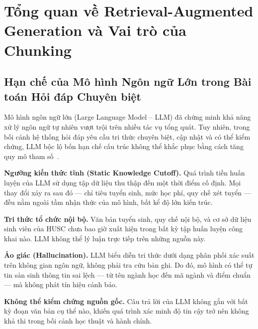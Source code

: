 \documentclass[12pt,a4paper]{report}
\theoremstyle{plain}
\theoremstyle{definition}
\begin{document}
	
	
	\chapter{Tổng quan về Retrieval-Augmented Generation và Vai trò của Chunking}
	\label{chap:rag_overview}
	
	\section{Hạn chế của Mô hình Ngôn ngữ Lớn trong Bài toán Hỏi đáp Chuyên biệt}
	\label{sec:llm_limits}
	
	Mô hình ngôn ngữ lớn (Large Language Model -- LLM) đã chứng minh khả năng
	xử lý ngôn ngữ tự nhiên vượt trội trên nhiều tác vụ tổng quát. Tuy nhiên,
	trong bối cảnh hệ thống hỏi đáp yêu cầu tri thức chuyên biệt, cập nhật và
	có thể kiểm chứng, LLM bộc lộ bốn hạn chế cấu trúc không thể khắc phục bằng
	cách tăng quy mô tham số~\cite{lewis2020retrieval}.
	
	\textbf{Ngưỡng kiến thức tĩnh (Static Knowledge Cutoff).} Quá trình tiền
	huấn luyện của LLM sử dụng tập dữ liệu thu thập đến một thời điểm cố định.
	Mọi thay đổi xảy ra sau đó --- chỉ tiêu tuyển sinh, mức học phí, quy chế
	xét tuyển --- đều nằm ngoài tầm nhận thức của mô hình, bất kể độ lớn kiến
	trúc.
	
	\textbf{Tri thức tổ chức nội bộ.} Văn bản tuyển sinh, quy chế nội bộ, và
	cơ sở dữ liệu sinh viên của HUSC chưa bao giờ xuất hiện trong bất kỳ tập
	huấn luyện công khai nào. LLM không thể lý luận trực tiếp trên những nguồn
	này.
	
	\textbf{Ảo giác (Hallucination).} LLM biểu diễn tri thức dưới dạng phân
	phối xác suất trên không gian ngôn ngữ, không phải tra cứu bản ghi. Do đó,
	mô hình có thể tự tin sản sinh thông tin sai lệch --- từ tên ngành học đến
	mã ngành và điểm chuẩn --- mà không phát tín hiệu cảnh báo.
	
	\textbf{Không thể kiểm chứng nguồn gốc.} Câu trả lời của LLM không gắn
	với bất kỳ đoạn văn bản cụ thể nào, khiến quá trình xác minh độ tin cậy
	trở nên không khả thi trong bối cảnh học thuật và hành chính.
	
\end{document}
